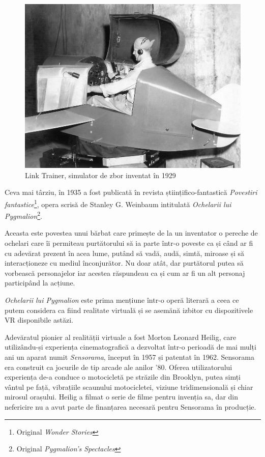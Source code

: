 \begin{figure}[h]
  \centering
  \includegraphics[scale=0.9]{img/link_trainer.jpg}
  \caption{Link Trainer, simulator de zbor inventat în 1929}
\end{figure}


Ceva mai târziu, în 1935 a fost publicată în revista științifico-fantastică \textit{Povestiri fantastice}\footnote{Original \textit{Wonder Stories}}, opera scrisă de Stanley G. Weinbaum intitulată \textit{Ochelarii lui Pygmalion}\footnote{Original \textit{Pygmalion's Spectacles}}.

Aceasta este povestea unui bărbat care primește de la un inventator o pereche de ochelari care îi permiteau purtătorului să ia parte într-o poveste ca și când ar fi cu adevărat prezent în acea lume, putând să vadă, audă, simtă, miroase și să interacționeze cu mediul înconjurător. Nu doar atât, dar purtătorul putea să vorbească personajelor iar acestea răspundeau ca și cum ar fi un alt personaj participând la acțiune.

\textit{Ochelarii lui Pygmalion} este prima mențiune într-o operă literară a ceea ce putem considera ca fiind realitate virtuală și se asemănă izbitor cu dispozitivele VR disponibile astăzi. 
\newpage

Adevăratul pionier al realității virtuale a fost Morton Leonard Heilig, care utilizându-și experiența cinematografică a dezvoltat într-o perioadă de mai mulți ani un aparat numit \textit{Sensorama}, început în 1957 și patentat în 1962.
Sensorama era construit ca jocurile de tip arcade ale anilor '80. Oferea utilizatorului experiența de-a conduce o motocicletă pe străzile din Brooklyn, putea simți vântul pe față, vibrațiile scaunului motocicletei, viziune tridimensională și chiar mirosul orașului.
Heilig a filmat o serie de filme pentru invenția sa, dar din nefericire nu a avut parte de finanțarea necesară pentru Sensorama în producție.

